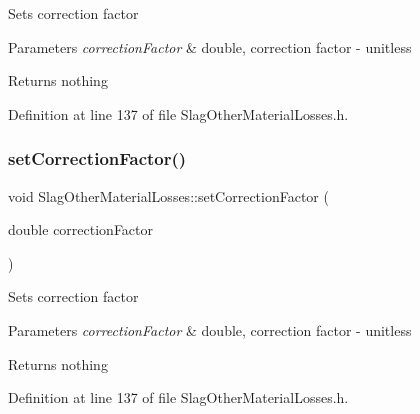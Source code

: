 Sets correction factor


\begin{DoxyParams}{Parameters}
{\em correction\+Factor} & double, correction factor -\/ unitless\\
\hline
\end{DoxyParams}
\begin{DoxyReturn}{Returns}
nothing 
\end{DoxyReturn}


Definition at line 137 of file Slag\+Other\+Material\+Losses.\+h.

\mbox{\label{class_slag_other_material_losses_a2aa985511888327bed6039da79c8958a}} 
\subsubsection{\texorpdfstring{set\+Correction\+Factor()}{setCorrectionFactor()}\hspace{0.1cm}{\footnotesize\ttfamily [3/3]}}
{\footnotesize\ttfamily void Slag\+Other\+Material\+Losses\+::set\+Correction\+Factor (\begin{DoxyParamCaption}\item[{double}]{correction\+Factor }\end{DoxyParamCaption})\hspace{0.3cm}{\ttfamily [inline]}}

Sets correction factor


\begin{DoxyParams}{Parameters}
{\em correction\+Factor} & double, correction factor -\/ unitless\\
\hline
\end{DoxyParams}
\begin{DoxyReturn}{Returns}
nothing 
\end{DoxyReturn}


Definition at line 137 of file Slag\+Other\+Material\+Losses.\+h.

\mbox{\label{class_slag_other_material_losses_a33d59aed5492ec2912615e93b6ff273e}} 
